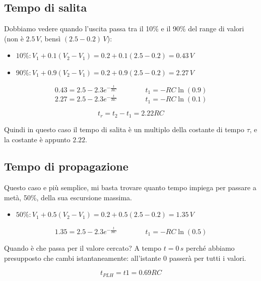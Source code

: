 \subsection{Tempo di salita}
Dobbiamo vedere quando l'uscita passa tra	il	10\%	e	il	90\%	del	range	di	valori (non è $2.5\,V$, bensì $(2.5-0.2)\,V$):

\begin{itemize}
    \item $10\%: V_1 + 0.1(V_2-V_1) = 0.2+0.1(2.5-0.2) = 0.43\,V$
    \item $90\%: V_1 + 0.9(V_2-V_1) = 0.2+0.9(2.5-0.2) = 2.27\,V$
\end{itemize}

\begin{equation*}
    0.43 = 2.5 - 2.3e^{-\frac{t}{RC}} \qquad\qquad t_1 = -RC\ln(0.9)
\end{equation*}
\begin{equation*}
    2.27 = 2.5 - 2.3e^{-\frac{t}{RC}} \qquad\qquad t_1 = -RC\ln(0.1)
\end{equation*}


\begin{equation*}
    t_r = t_2 - t_1 = 2.22RC
\end{equation*}

Quindi in questo caso il tempo di salita è un multiplo della costante di tempo $\tau$, e la costante è appunto $2.22$.

\subsection{Tempo di propagazione}
Questo caso e più semplice, mi basta trovare quanto tempo impiega per passare a metà, 50\%, della sua escursione massima.


\begin{itemize}
    \item[] $50\%: V_1 + 0.5(V_2-V_1) = 0.2+0.5(2.5-0.2) = 1.35\,V$
\end{itemize}
\begin{equation*}
   1.35 = 2.5 - 2.3e^{-\frac{t}{RC}} \qquad\qquad t_1 = -RC\ln(0.5)
\end{equation*}

Quando è che passa per il valore cercato? A tempo $t=0\,s$ perché abbiamo presupposto che cambi istantaneamente: all'istante 0 passerà per tutti i valori.

\begin{equation*}
    t_{PLH} = t1 = 0.69RC
\end{equation*}

